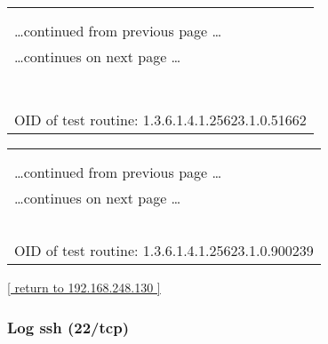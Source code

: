 \documentclass{article}
\begin{document}
\begin{longtable}{|p{}|}
\hline
\rowcolor{openvas_log}{\color{white}{Log (CVSS: 0.0) }}\\
\rowcolor{openvas_log}{\color{white}{NVT: Traceroute}}\\
\hline
\endfirsthead
\hfill\ldots continued from previous page \ldots \\
\hline
\endhead
\hline
\ldots continues on next page \ldots \\
\endfoot
\hline
\endlastfoot
\\
\rowcolor{white}{\verb=Here is the route from 192.168.248.132 to 192.168.248.130:=}\\
\rowcolor{white}{\verb=192.168.248.132=}\\
\rowcolor{white}{\verb=192.168.248.130=}\\
\rowcolor{white}{\verb==}\\
\rowcolor{white}{\verb==}\\
\\
OID of test routine: 1.3.6.1.4.1.25623.1.0.51662\\
\end{longtable}

\begin{longtable}{|p{}|}
\hline
\rowcolor{openvas_log}{\color{white}{Log (CVSS: 0.0) }}\\
\rowcolor{openvas_log}{\color{white}{NVT: Checks for open tcp ports}}\\
\hline
\endfirsthead
\hfill\ldots continued from previous page \ldots \\
\hline
\endhead
\hline
\ldots continues on next page \ldots \\
\endfoot
\hline
\endlastfoot
\\
\rowcolor{white}{\verb=Open TCP ports: 37, 22, 113, 13=}\\
\rowcolor{white}{\verb==}\\
\rowcolor{white}{\verb==}\\
\\
OID of test routine: 1.3.6.1.4.1.25623.1.0.900239\\
\end{longtable}

\begin{footnotesize}\hyperref[host:192.168.248.130]{[ return to 192.168.248.130 ]}\end{footnotesize}
\subsubsection{Log ssh (22/tcp)}
\label{port:192.168.248.130 ssh (22/tcp) Log}
\end{document}
